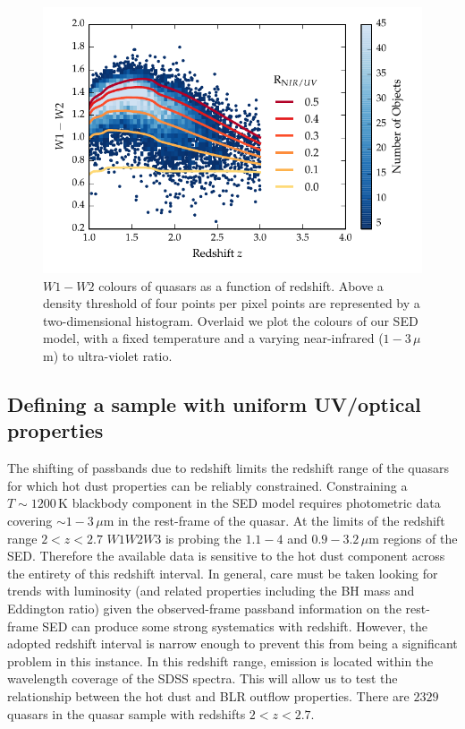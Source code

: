\begin{figure}[t!]
\centering
\includegraphics[width=\columnwidth]{figures/chapter05/w1w2_versus_redshift_ratio.pdf}
\caption[{$W1 - W2$ colours of quasars as a function of redshift.}]{$W1 - W2$ colours of quasars as a function of redshift. Above a density threshold of four points per pixel points are represented by a two-dimensional histogram. Overlaid we plot the colours of our SED model, with a fixed temperature and a varying near-infrared ($1 - 3$\,$\mu$m) to ultra-violet ratio.}
  \label{fig:w1w2colorsratio}
\end{figure}

\subsection{Defining a sample with uniform UV/optical properties}
\label{sec:ch5-hotdustsample}

The shifting of passbands due to redshift limits the redshift range of the quasars for which hot dust properties can be reliably constrained.
Constraining a $T\sim1200$\,K blackbody component in the SED model requires photometric data covering $\sim1-3$\,$\mu$m in the rest-frame of the quasar. 
At the limits of the redshift range $2 < z < 2.7$ $W1W2W3$ is probing the $1.1-4$ and $0.9-3.2$\,$\mu$m regions of the SED. 
Therefore the available data is sensitive to the hot dust component across the entirety of this redshift interval. 
In general, care must be taken looking for trends with luminosity (and related properties including the BH mass and Eddington ratio) given the observed-frame passband information on the rest-frame SED can produce some strong systematics with redshift.
However, the adopted redshift interval is narrow enough to prevent this from being a significant problem in this instance. 
In this redshift range,  emission is located within the wavelength coverage of the SDSS spectra.
This will allow us to test the relationship between the hot dust and BLR outflow properties. 
There are $2329$ quasars in the quasar sample with redshifts $2 < z < 2.7$. 

